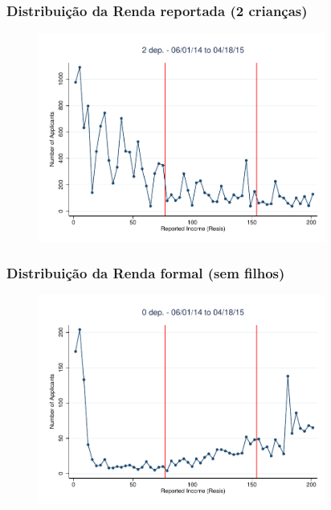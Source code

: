 \documentclass[xcolor=pdftex,dvipsnames,table]{beamer}
\begin{document}
\begin{frame}[label=ybar2]
\frametitle{Distribui\c{c}\~ao da Renda reportada (2 crian\c{c}as)}
\begin{figure}[H]
\begin{center}
\includegraphics[height=2.7in]{Dom_060114_non_2_bin3p5.pdf}
\end{center}
\end{figure}
\hyperlink{ybar2_sel}{}
\end{frame}

\begin{frame}
\frametitle{Distribui\c{c}\~ao da Renda formal (sem filhos)}
\begin{figure}[H]
\begin{center}
\includegraphics[height=2.7in]{Rais_060114_non_0_bin3p5.pdf}
\end{center}
\end{figure}
\end{frame}
\end{document}
